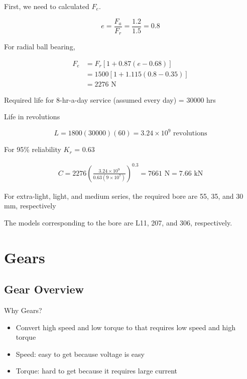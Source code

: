 \documentclass[
10pt,
a4paper,
openany,
svgnames,
]{book}
\begin{document}
\begin{solution}
\label{sec:orgb6be1c8}

First, we need to calculated \(F_e\).

$$e = \frac{F_a}{F_r} = \frac{1.2}{1.5} = 0.8$$

 For radial ball bearing,

\begin{align*}
  F_{e} &= F_r \left[ 1 + 0.87(e - 0.68) \right] \\
        &= 1500 \left[ 1 + 1.115(0.8 - 0.35) \right] \\
        &= 2276 \text{ N}
\end{align*}

Required life for 8-hr-a-day service (assumed every day) = 30000 hrs

Life in revolutions

$$L = 1800(30000)(60) = 3.24 \times 10^9 \text{ revolutions}$$

For 95\% reliability \(K_r\) = 0.63

\begin{align*}
    C = 2276 \left( \frac{3.24 \times 10^9}{0.63 (9 \times 10^7)} \right)^{0.3} = 7661 \text{ N} = 7.66 \text{ kN}
\end{align*}

For extra-light, light, and medium series, the required bore are 55, 35, and 30 mm, respectively

The models corresponding to the bore are L11, 207, and 306, respectively.

\end{solution}



\chapter{Gears}

\section{Gear Overview}

\begin{frame}{Why Gears?}
  \begin{itemize}
    \item Convert high speed and low torque to that requires low speed and high torque
    \item Speed: easy to get because voltage is easy
    \item Torque: hard to get because it requires large current
  \end{itemize}
\end{frame}
\end{document}
